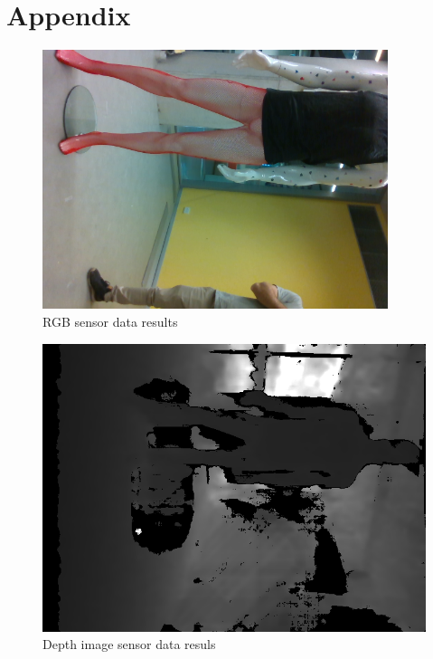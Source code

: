 \documentclass[12pt]{report}
\begin{document}
\chapter{Appendix}
\begin{figure}[h]
  \centering
  \includegraphics[width=0.9\textwidth, angle=90]{scan1.png}
  \caption{RGB sensor data results}
  \label{fig:scanRGB}
\end{figure}

\newpage
\begin{figure}[h]
  \centering
  \includegraphics[width=1\textwidth, angle=90]{scan2.png}
  \caption{Depth image sensor data resuls}
  \label{fig:scanDepth}
\end{figure}
\end{document}
